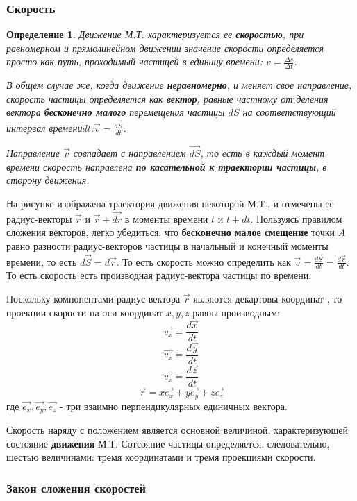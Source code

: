 \documentclass{article}
\newtheorem{theorem}{Определение} %
\begin{document}
\subsubsection{Скорость}
\begin{theorem}
Движение М.Т. характеризуется ее \textbf{скоростью}, при равномерном и прямолинейном движении значение скорости определяется просто как путь, проходимый частицей в единицу времени: $v=\frac{\Delta s}{\Delta{t}}$. 

В общем случае же, когда движение \textbf{неравномерно}, и меняет свое направление, скорость частицы определяется как \textbf{вектор}, равные частному от деления вектора \textbf{бесконечно малого} перемещения частицы $dS$ на соответствующий интервал времени$dt$:$\vec{v} = \frac{d\vec{S}}{dt}$.

 Направление $\vec{v}$ совпадает с направлением $\vec{dS}$, то есть в каждый момент времени скорость направлена \textbf{по касательной к траектории частицы}, в сторону движения.
\end{theorem}	

На рисунке изображена траектория движения некоторой М.Т., и отмечены ее радиус-векторы $\vec{r}$ и $\vec{r} + \vec{dr}$ в моменты времени $t$ и $t+dt$. Пользуясь правилом сложения векторов, легко убедиться, что \textbf{бесконечно малое смещение} точки $A$ равно разности радиус-векторов частицы в начальный и конечный моменты времени, то есть $d\vec{S}=d\vec{r}$. То есть скорость можно определить как $\vec{v} = \frac{d\vec{S}}{dt} = \frac{d\vec{r}}{dt}$. То есть скорость есть производная радиус-вектора частицы по времени.

Поскольку компонентами радиус-вектора $\vec{r}$ являются декартовы координат , то проекции скорости на оси координат $x,y,z$ равны производным: 
$$\vec{v_x} = \frac{d\vec{x}}{dt}$$
$$\vec{v_x} = \frac{d\vec{y}}{dt}$$
$$\vec{v_x} = \frac{d\vec{z}}{dt}$$
$$ \vec{r} = x\vec{e_x} + y\vec{e_y} + z\vec{e_z}$$
где $\vec{e_x}, \vec{e_y}, \vec{e_z}$ - три взаимно перпендикулярных единичных вектора.

Скорость наряду с положением является основной величиной, характеризующей состояние \textbf{движения } М.Т. Сотсояние частицы определяется, следовательно, шестью величинами: тремя координатами и тремя проекциями скорости.

\subsubsection{Закон сложения скоростей}
\end{document}
